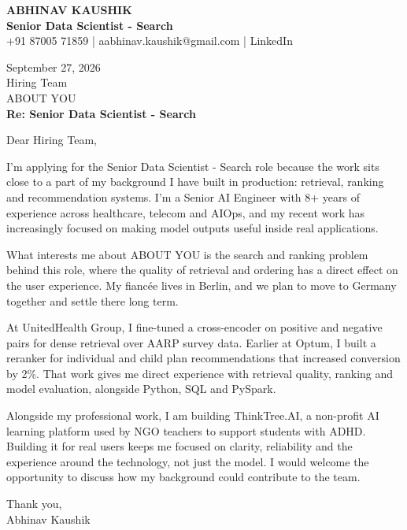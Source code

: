 \documentclass[10pt,a4paper]{article}
\begin{document}
\begin{center}
{\Large\bfseries ABHINAV KAUSHIK}\\[2pt]
{\bfseries Senior Data Scientist - Search}\\[2pt]
+91 87005 71859 \quad | \quad aabhinav.kaushik@gmail.com \quad | \quad LinkedIn
\end{center}
\vspace{8pt}
September 27, 2026\\[6pt]
Hiring Team\\
ABOUT YOU\\[4pt]
\textbf{Re: Senior Data Scientist - Search}

Dear Hiring Team,

I’m applying for the Senior Data Scientist - Search role because the work sits close to a part of my background I have built in production: retrieval, ranking and recommendation systems. I’m a Senior AI Engineer with 8+ years of experience across healthcare, telecom and AIOps, and my recent work has increasingly focused on making model outputs useful inside real applications.

What interests me about ABOUT YOU is the search and ranking problem behind this role, where the quality of retrieval and ordering has a direct effect on the user experience. My fiancée lives in Berlin, and we plan to move to Germany together and settle there long term.

At UnitedHealth Group, I fine-tuned a cross-encoder on positive and negative pairs for dense retrieval over AARP survey data. Earlier at Optum, I built a reranker for individual and child plan recommendations that increased conversion by 2\%. That work gives me direct experience with retrieval quality, ranking and model evaluation, alongside Python, SQL and PySpark.

Alongside my professional work, I am building ThinkTree.AI, a non-profit AI learning platform used by NGO teachers to support students with ADHD. Building it for real users keeps me focused on clarity, reliability and the experience around the technology, not just the model. I would welcome the opportunity to discuss how my background could contribute to the team.

Thank you,\\
Abhinav Kaushik
\end{document}
